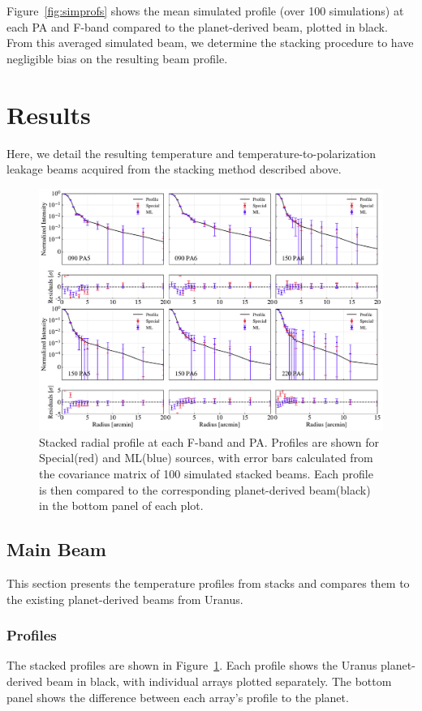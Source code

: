 Figure~\ref{fig:simprofs} shows the mean simulated profile (over 100 simulations) at each PA and F-band compared to the planet-derived beam, plotted in black.  From this averaged simulated beam, we determine the stacking procedure to have negligible bias on the resulting beam profile.

\section{Results}
\label{sec:act_results}
Here, we detail the resulting temperature and temperature-to-polarization leakage beams acquired from the stacking method described above. 

\begin{figure}[t]
    \centering
    \includegraphics[width=\textwidth]{Figures/profiles_noP_15.pdf}
    \caption{Stacked radial profile at each F-band and PA.  Profiles are shown for Special(red) and ML(blue) sources, with error bars calculated from the covariance matrix of 100 simulated stacked beams.  Each profile is then compared to the corresponding planet-derived beam(black) in the bottom panel of each plot.
    }
    \label{fig:profiles}
\end{figure}

\subsection{Main Beam}
\label{subsec:mainbeam}
This section presents the temperature profiles from stacks and compares them to the existing planet-derived beams from Uranus. 

\subsubsection{Profiles}
\label{subsubsec:profiles}
The stacked profiles are shown in Figure~\ref{fig:profiles}.  Each profile shows the Uranus planet-derived beam in black, with individual arrays plotted separately.  The bottom panel shows the difference between each array's profile to the planet.

